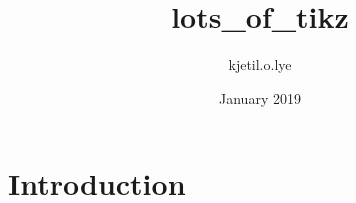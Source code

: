 \documentclass{article}
\title{lots_of_tikz}
\author{kjetil.o.lye }
\date{January 2019}
\begin{document}
\maketitle

\section{Introduction}
\end{document}
